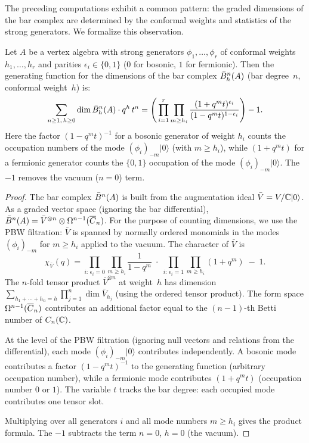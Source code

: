 The preceding computations exhibit a common pattern: the graded
dimensions of the bar complex are determined by the
conformal weights and statistics of the strong generators.
We formalize this observation.

\begin{proposition}
\label{prop:universal-dim-formula}
Let $A$ be a vertex algebra with strong generators
$\phi_1, \ldots, \phi_r$ of conformal weights $h_1, \ldots, h_r$
and parities $\epsilon_i \in \{0, 1\}$ ($0$ for bosonic, $1$ for
fermionic).  Then the generating function for the dimensions of the
bar complex $\bar{B}^n_h(A)$ (bar degree~$n$, conformal weight~$h$) is:
\begin{equation}\label{eq:universal-dim}
\sum_{n \geq 1,\, h \geq 0} \dim \bar{B}^n_h(A) \cdot q^h \, t^n
= \Biggl(\,\prod_{i=1}^{r}
  \prod_{m \geq h_i}
  \frac{(1 + q^m t)^{\epsilon_i}}{(1 - q^m t)^{1-\epsilon_i}}
\Biggr) - 1.
\end{equation}
Here the factor $(1 - q^m t)^{-1}$ for a bosonic generator
of weight $h_i$ counts the occupation numbers of the mode
$(\phi_i)_{-m}|0\rangle$ (with $m \geq h_i$), while
$(1 + q^m t)$ for a fermionic generator counts the $\{0,1\}$
occupation of the mode $(\phi_i)_{-m}|0\rangle$.
The $-1$ removes the vacuum ($n = 0$) term.
\end{proposition}

\begin{proof}
The bar complex $\bar{B}^n(A)$ is built from the augmentation ideal
$\bar{V} = V / \mathbb{C}|0\rangle$.  As a graded vector space (ignoring
the bar differential), $\bar{B}^n(A) = \bar{V}^{\otimes n} \otimes
\Omega^{n-1}(\overline{C}_n)$.  For the purpose of
counting dimensions, we use the PBW filtration: $\bar{V}$ is
spanned by normally ordered monomials in the modes
$(\phi_i)_{-m}$ for $m \geq h_i$ applied to the vacuum.
The character of $\bar{V}$ is
\[
\chi_{\bar{V}}(q) = \prod_{i:\,\epsilon_i = 0}
  \prod_{m \geq h_i} \frac{1}{1 - q^m}
\;\cdot\; \prod_{i:\,\epsilon_i = 1}
  \prod_{m \geq h_i} (1 + q^m) \;-\; 1.
\]
The $n$-fold tensor product $\bar{V}^{\otimes n}$ at weight~$h$
has dimension $\sum_{h_1 + \cdots + h_n = h}
\prod_{j=1}^n \dim \bar{V}_{h_j}$ (using the ordered tensor product).
The form space $\Omega^{n-1}(\overline{C}_n)$ contributes
an additional factor equal to the $(n-1)$-th Betti number of
$C_n(\mathbb{C})$.

At the level of the PBW filtration (ignoring null vectors and
relations from the differential), each mode
$(\phi_i)_{-m}|0\rangle$ contributes independently.
A bosonic mode contributes a factor $(1 - q^m t)^{-1}$
to the generating function (arbitrary occupation number), while
a fermionic mode contributes $(1 + q^m t)$
(occupation number $0$ or $1$).  The variable $t$ tracks the
bar degree: each occupied mode contributes one tensor slot.

Multiplying over all generators $i$ and all mode numbers $m \geq h_i$
gives the product formula.  The $-1$ subtracts the term
$n = 0$, $h = 0$ (the vacuum).
\end{proof}

